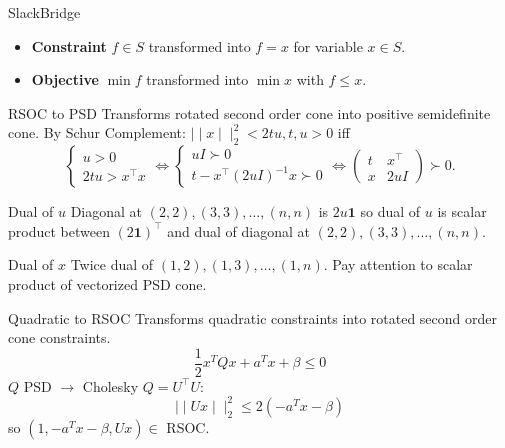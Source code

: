 \documentclass{beamer}
\def\lVert{\mid\!\mid}
\def\rVert{\mid\!\mid}
\begin{document}
\begin{frame}[allowframebreaks]
    \begin{block}{SlackBridge}
      \begin{itemize}
        \item \textbf{Constraint} $f \in S$ transformed into $f = x$ for variable $x \in S$.
        \item \textbf{Objective} $\min f$ transformed into $\min x$ with $f \le x$.
      \end{itemize}
    \end{block}
  \end{frame}

\begin{frame}{RSOC to PSD}
  Transforms rotated second order cone into positive semidefinite cone.
  By Schur Complement: $\lVert x\rVert_2^2 < 2tu, t, u > 0$ iff
  $$
  \begin{cases}
    u > 0\\
    2tu > x^\top x
  \end{cases}
  \Leftrightarrow
  \begin{cases}
    uI \succ 0\\
    t - x^\top (2uI)^{-1} x \succ 0
  \end{cases}
  \Leftrightarrow
  \begin{pmatrix}
    t & x^\top\\
    x & 2uI
  \end{pmatrix} \succ 0.
  $$
  \begin{block}{Dual of $u$}
    Diagonal at $(2,2), (3, 3), \ldots, (n, n)$ is $2u \mathbf{1}$ so
    dual of $u$ is scalar product between $(2\mathbf{1})^\top$ and dual of
    diagonal at $(2,2), (3, 3), \ldots, (n, n)$.
  \end{block}
  \begin{block}{Dual of $x$}
    Twice dual of $(1, 2), (1, 3), \ldots, (1, n)$.
    Pay attention to scalar product of vectorized PSD cone.
  \end{block}
\end{frame}

\begin{frame}{Quadratic to RSOC}
  Transforms quadratic constraints into rotated second order cone constraints.
  $$\frac{1}{2}x^T Q x + a^T x + \beta \le 0$$
  $Q$ PSD $\to$ Cholesky $Q = U^\top U$:
  $$\lVert U x\rVert_2^2 \le 2 (-a^T x - \beta)$$
  so $(1, -a^T x - \beta, Ux) \in {}$ RSOC.
\end{frame}
\end{document}
